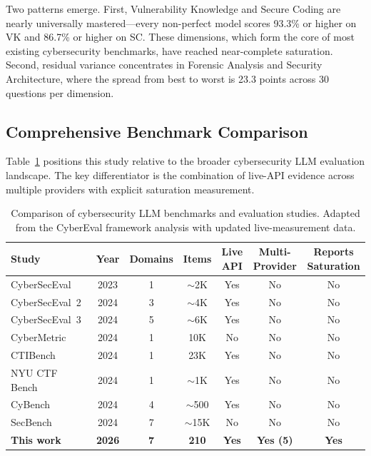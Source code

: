 \documentclass[final]{elsarticle}
\begin{document}
Two patterns emerge. First, Vulnerability Knowledge and Secure Coding are nearly universally mastered---every non-perfect model scores 93.3\% or higher on VK and 86.7\% or higher on SC. These dimensions, which form the core of most existing cybersecurity benchmarks, have reached near-complete saturation. Second, residual variance concentrates in Forensic Analysis and Security Architecture, where the spread from best to worst is 23.3 points across 30 questions per dimension.

\subsection{Comprehensive Benchmark Comparison}

Table~\ref{tab:benchmark_comparison} positions this study relative to the broader cybersecurity LLM evaluation landscape. The key differentiator is the combination of live-API evidence across multiple providers with explicit saturation measurement.

\begin{table}[t]
\centering
\caption{Comparison of cybersecurity LLM benchmarks and evaluation studies. Adapted from the CyberEval framework analysis with updated live-measurement data.}
\label{tab:benchmark_comparison}
\scriptsize
\begin{tabular}{lcccccc}
\toprule
\textbf{Study} & \textbf{Year} & \textbf{Domains} & \textbf{Items} & \textbf{Live API} & \textbf{Multi-Provider} & \textbf{Reports Saturation} \\
\midrule
CyberSecEval~\cite{bhatt2023cyberseceval} & 2023 & 1 & $\sim$2K & Yes & No & No \\
CyberSecEval~2~\cite{bhatt2024cyberseceval2} & 2024 & 3 & $\sim$4K & Yes & No & No \\
CyberSecEval~3~\cite{wan2024cyberseceval3} & 2024 & 5 & $\sim$6K & Yes & No & No \\
CyberMetric~\cite{tihanyi2024cybermetric} & 2024 & 1 & 10K & No & No & No \\
CTIBench~\cite{alam2024ctibench} & 2024 & 1 & 23K & Yes & No & No \\
NYU CTF Bench~\cite{shao2024nyuctf} & 2024 & 1 & $\sim$1K & Yes & No & No \\
CyBench~\cite{zhang2024cybench} & 2024 & 4 & $\sim$500 & Yes & No & No \\
SecBench~\cite{jing2024secbench} & 2024 & 7 & $\sim$15K & No & No & No \\
\midrule
\textbf{This work} & \textbf{2026} & \textbf{7} & \textbf{210} & \textbf{Yes} & \textbf{Yes (5)} & \textbf{Yes} \\
\bottomrule
\end{tabular}
\end{table}
\end{document}
